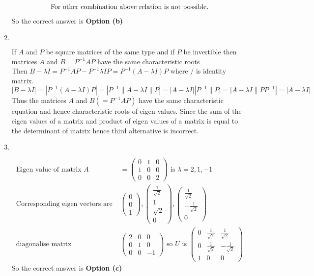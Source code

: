\begin{enumerate}
\begin{answer}
\begin{align*}
	\intertext{For other combination above relation is not possible.}
	\end{align*}
		So the correct answer is \textbf{Option (b)}
\end{answer}
\item $\left. \right. $
\begin{answer}
	If $A$ and $P$ be square matrices of the same type and if $P$ be invertible then matrices $A$ and $B=P^{-1} A P$ have the same characteristic roots\\
	Then $B-\lambda I=P^{-1} A P-P^{-1} \lambda I P=P^{-1}(A-\lambda I) P$ where $/$ is identity matrix.
	$$
	|B-\lambda I|=\left|P^{-1}(A-\lambda I) P\right|=\left|P^{-1}\|A-\lambda I\| P\right|=|A-\lambda I|\left|P^{-1}\|P|=| A-\lambda I\| P P^{-1}\right|=|A-\lambda I|
	$$
	Thus the matrices $A$ and $B\left(=P^{-1} A P\right)$ have the same characteristic equation and hence characteristic roots of eigen values. Since the sum of the eigen values of a matrix and product of eigen values of a matrix is equal to the determinant of matrix hence third alternative is incorrect.
\end{answer}
\item $\left. \right. $
\begin{answer}
	\begin{align*}
	\text{Eigen value of matrix }A&=\left(\begin{array}{ccc}0 & 1 & 0 \\ 1 & 0 & 0 \\ 0 & 0 & 2\end{array}\right)\text{ is }\lambda=2,1,-1\\
	\text{Corresponding eigen vectors are }&\left(\begin{array}{l}0 \\ 0 \\ 1\end{array}\right),\left(\begin{array}{c}\frac{1}{\sqrt{2}} \\ 1 \\ \sqrt{2} \\ 0\end{array}\right),\left(\begin{array}{c}\frac{1}{\sqrt{2}} \\ -\frac{1}{\sqrt{2}} \\ 0\end{array}\right)\\
	\text{diagonalise matrix }&\left(\begin{array}{ccc}2 & 0 & 0 \\ 0 & 1 & 0 \\ 0 & 0 & -1\end{array}\right)\text{ so $U$ is }\left(\begin{array}{ccc}0 & \frac{1}{\sqrt{2}} & \frac{1}{\sqrt{2}} \\ 0 & \frac{1}{\sqrt{2}} & -\frac{1}{\sqrt{2}} \\ 1 & 0 & 0\end{array}\right)
	\end{align*}
		So the correct answer is \textbf{Option (c)}
\end{answer}


\end{enumerate}